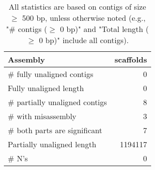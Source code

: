 \documentclass[12pt,a4paper]{article}
\begin{document}
\begin{table}[ht]
\begin{center}
\caption{All statistics are based on contigs of size $\geq$ 500 bp, unless otherwise noted (e.g., "\# contigs ($\geq$ 0 bp)" and "Total length ($\geq$ 0 bp)" include all contigs).}
\begin{tabular}{|l*{1}{|r}|}
\hline
Assembly & scaffolds \\ \hline
\# fully unaligned contigs & 0 \\ \hline
Fully unaligned length & 0 \\ \hline
\# partially unaligned contigs & 8 \\ \hline
\hspace{5mm}\# with misassembly & 3 \\ \hline
\hspace{5mm}\# both parts are significant & 7 \\ \hline
Partially unaligned length & 1194117 \\ \hline
\# N's & 0 \\ \hline
\end{tabular}
\end{center}
\end{table}
\end{document}
